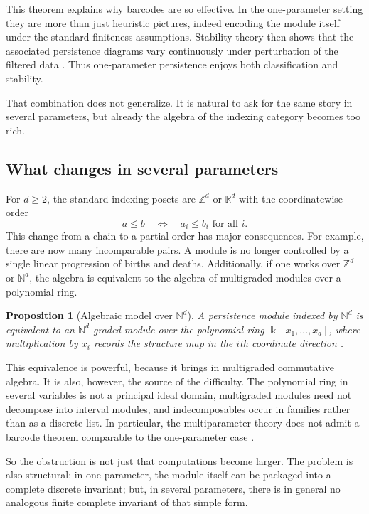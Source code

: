\documentclass[11pt]{article}
\newcommand{\R}{\mathbb{R}}
\newcommand{\Z}{\mathbb{Z}}
\newcommand{\kk}{\Bbbk}
\newtheorem{proposition}[theorem]{Proposition}
\theoremstyle{definition}
\theoremstyle{remark}
\begin{document}
This theorem explains why barcodes are so effective. In the one-parameter setting they are more than just heuristic pictures, indeed encoding the module itself under the standard finiteness assumptions. Stability theory then shows that the associated persistence diagrams vary continuously under perturbation of the filtered data \cite{ELZ02,CEH07,CDSGO16}. Thus one-parameter persistence enjoys both classification and stability.

That combination does not generalize. It is natural to ask for the same story in several parameters, but already the algebra of the indexing category becomes too rich.

\subsection{What changes in several parameters}

For $d \geq 2$, the standard indexing posets are $\Z^d$ or $\R^d$ with the coordinatewise order
\[
a \leq b \quad \Longleftrightarrow \quad a_i \leq b_i \text{ for all } i.
\]
This change from a chain to a partial order has major consequences. For example, there are now many incomparable pairs. A module is no longer controlled by a single linear progression of births and deaths. Additionally, if one works over $\Z^d$ or $\mathbb{N}^d$, the algebra is equivalent to the algebra of multigraded modules over a polynomial ring.

\begin{proposition}[Algebraic model over $\mathbb{N}^d$]
A persistence module indexed by $\mathbb{N}^d$ is equivalent to an $\mathbb{N}^d$-graded module over the polynomial ring $\kk[x_1,\dots,x_d]$, where multiplication by $x_i$ records the structure map in the $i$th coordinate direction \cite{CZ09,Oud15}.
\end{proposition}

This equivalence is powerful, because it brings in multigraded commutative algebra. It is also, however, the source of the difficulty. The polynomial ring in several variables is not a principal ideal domain, multigraded modules need not decompose into interval modules, and indecomposables occur in families rather than as a discrete list. In particular, the multiparameter theory does not admit a barcode theorem comparable to the one-parameter case \cite{CZ09,Les15}.

So the obstruction is not just that computations become larger. The problem is also structural: in one parameter, the module itself can be packaged into a complete discrete invariant; but, in several parameters, there is in general no analogous finite complete invariant of that simple form.
\end{document}
